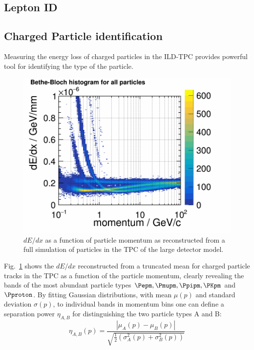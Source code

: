 \subsection{Lepton ID}


\subsection{Charged Particle identification}
%
%
Measuring the energy loss of charged particles in the ILD-TPC provides powerful tool for identifying the type of the particle.
\begin{figure}[b!]
\includegraphics[width=0.8\hsize]{Performance/fig/dEdx_BBAll_lowGran_bigCap.png}
\caption{\label{fig:perf:dedx_tpc}
  $dE/dx$ as a function of particle momentum as reconstructed from a full simulation of particles in the TPC of the large detector model.
}
\end{figure}
%
Fig.~\ref{fig:perf:dedx_tpc} shows the $dE/dx$ reconstructed from a truncated mean for charged particle tracks in the TPC as a function of
the particle momentum, clearly revealing the bands of the most abundant particle types $\Pepm, \Pmupm, \Ppipm, \PKpm$ and $\Pproton$.
By fitting Gaussian distributions, with mean $\mu(p)$ and standard deviation $\sigma(p)$, to individual bands in momentum bins one can
define a separation power $\eta_{A,B}$ for distinguishing the two particle types A and B:
\begin{equation}
\eta_{A,B}(p) = \frac{ |\mu_A(p) - \mu_B(p)| } { \sqrt{ \frac{1}{2} ( \sigma^2_A(p) + \sigma^2_B(p) )  }  }
\label{ild:eq:seppow}
\end{equation}
